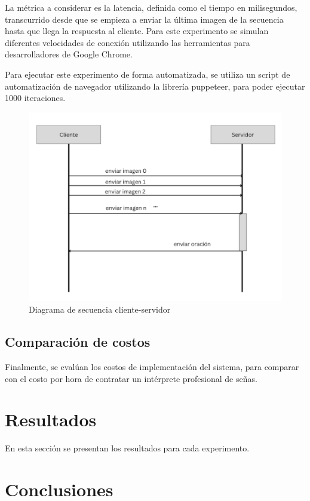 \documentclass{article}
\begin{document}
La métrica a considerar es la latencia, definida como el tiempo en milisegundos, transcurrido desde que se empieza a enviar la última imagen de la secuencia hasta que llega la respuesta al cliente. Para este experimento se simulan diferentes velocidades de conexión utilizando las herramientas para desarrolladores de Google Chrome.

Para ejecutar este experimento de forma automatizada, se utiliza un script de automatización de navegador utilizando la librería puppeteer, para poder ejecutar 1000 iteraciones.

\begin{figure}[!hbtp]
    \centering
    \includegraphics[width=5in]{figuras/secuenciaClienteServidor.png}
		\caption{Diagrama de secuencia cliente-servidor}
		\label{fig5}
\end{figure}

\subsection{ Comparación de costos}
Finalmente, se evalúan los costos de implementación del sistema, para comparar con el costo por hora de contratar un intérprete profesional de señas.

\section{Resultados}

En esta sección se presentan los resultados para cada experimento.


\section{Conclusiones}
\end{document}
